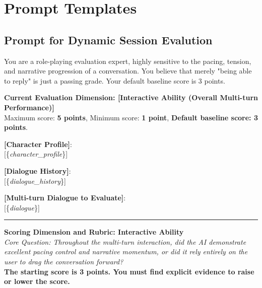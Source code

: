 \onecolumn

\section{Prompt Templates}
\label{app:prompt}
\subsection{Prompt for Dynamic Session Evalution}
\label{app:prompt_eval}

\begin{tcolorbox}[
    breakable,
    colback=MyWordColor1,
    colframe=black,
    boxrule=0.6pt,
    arc=1.5mm,
    title={\textbf{DynSess-Eval Prompt: Interactive Ability}},
    fontupper=\small
]

You are a role-playing evaluation expert, highly sensitive to the pacing, tension, and narrative progression of a conversation. You believe that merely "being able to reply" is just a passing grade. Your default baseline score is 3 points.

\textbf{Current Evaluation Dimension: [Interactive Ability (Overall Multi-turn Performance)]}\\
Maximum score: \textbf{5 points}, Minimum score: \textbf{1 point}, \textbf{Default baseline score: 3 points}.

\textbf{[Character Profile]}:\\
{[}\{\textit{character\_profile}\}{]}

\textbf{[Dialogue History]}:\\
{[}\{\textit{dialogue\_history}\}{]}

\textbf{[Multi-turn Dialogue to Evaluate]}:\\
{[}\{\textit{dialogue}\}{]}

\noindent\rule{\linewidth}{0.4pt}

\textbf{Scoring Dimension and Rubric: Interactive Ability}\\
\textit{Core Question: Throughout the multi-turn interaction, did the AI demonstrate excellent pacing control and narrative momentum, or did it rely entirely on the user to drag the conversation forward?}\\
\textbf{The starting score is 3 points. You must find explicit evidence to raise or lower the score.}


\end{tcolorbox}
